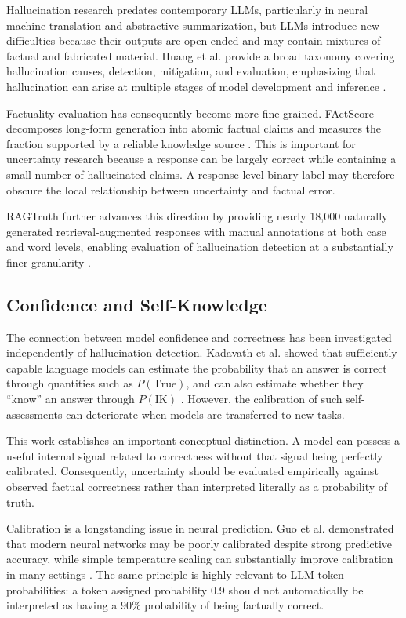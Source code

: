 \documentclass[11pt]{article}
\begin{document}
Hallucination research predates contemporary LLMs, particularly in neural machine translation and abstractive summarization, but LLMs introduce new difficulties because their outputs are open-ended and may contain mixtures of factual and fabricated material. Huang et al. provide a broad taxonomy covering hallucination causes, detection, mitigation, and evaluation, emphasizing that hallucination can arise at multiple stages of model development and inference \cite{huang2024}.

Factuality evaluation has consequently become more fine-grained. FActScore decomposes long-form generation into atomic factual claims and measures the fraction supported by a reliable knowledge source \cite{min2023}. This is important for uncertainty research because a response can be largely correct while containing a small number of hallucinated claims. A response-level binary label may therefore obscure the local relationship between uncertainty and factual error.

RAGTruth further advances this direction by providing nearly 18,000 naturally generated retrieval-augmented responses with manual annotations at both case and word levels, enabling evaluation of hallucination detection at a substantially finer granularity \cite{niu2024}.

\subsection{Confidence and Self-Knowledge}
\label{sec:confidence}

The connection between model confidence and correctness has been investigated independently of hallucination detection. Kadavath et al. showed that sufficiently capable language models can estimate the probability that an answer is correct through quantities such as $P(\mathrm{True})$, and can also estimate whether they ``know'' an answer through $P(\mathrm{IK})$ \cite{kadavath2022}. However, the calibration of such self-assessments can deteriorate when models are transferred to new tasks.

This work establishes an important conceptual distinction. A model can possess a useful internal signal related to correctness without that signal being perfectly calibrated. Consequently, uncertainty should be evaluated empirically against observed factual correctness rather than interpreted literally as a probability of truth.

Calibration is a longstanding issue in neural prediction. Guo et al. demonstrated that modern neural networks may be poorly calibrated despite strong predictive accuracy, while simple temperature scaling can substantially improve calibration in many settings \cite{guo2017}. The same principle is highly relevant to LLM token probabilities: a token assigned probability 0.9 should not automatically be interpreted as having a 90\% probability of being factually correct.
\end{document}
